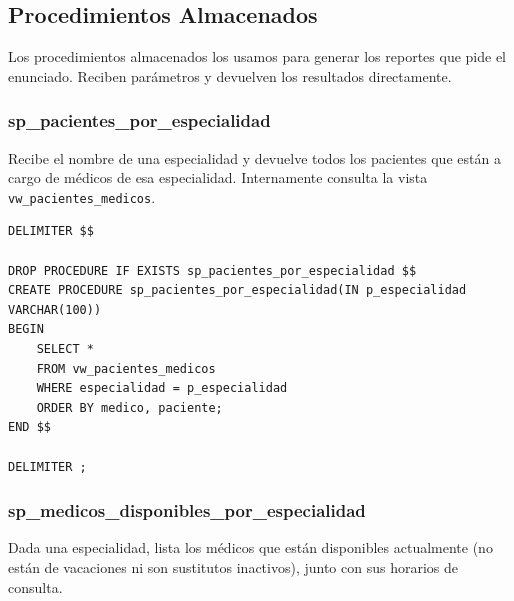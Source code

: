 \documentclass[12pt,a4paper]{article}
\begin{document}
\newpage

\subsection{Procedimientos Almacenados}

Los procedimientos almacenados los usamos para generar los reportes que pide el enunciado. Reciben par\'ametros y devuelven los resultados directamente.

\subsubsection{sp\_pacientes\_por\_especialidad}
Recibe el nombre de una especialidad y devuelve todos los pacientes que est\'an a cargo de m\'edicos de esa especialidad. Internamente consulta la vista \texttt{vw\_pacientes\_medicos}.

{\small\begin{verbatim}
DELIMITER $$

DROP PROCEDURE IF EXISTS sp_pacientes_por_especialidad $$
CREATE PROCEDURE sp_pacientes_por_especialidad(IN p_especialidad VARCHAR(100))
BEGIN
    SELECT *
    FROM vw_pacientes_medicos
    WHERE especialidad = p_especialidad
    ORDER BY medico, paciente;
END $$

DELIMITER ;
\end{verbatim}}

\subsubsection{sp\_medicos\_disponibles\_por\_especialidad}
Dada una especialidad, lista los m\'edicos que est\'an disponibles actualmente (no est\'an de vacaciones ni son sustitutos inactivos), junto con sus horarios de consulta.
\end{document}
